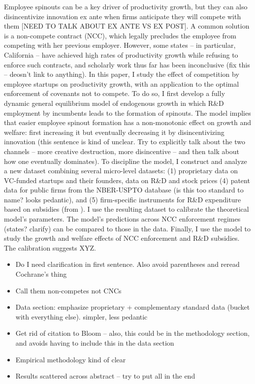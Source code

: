 \documentclass[12pt,english]{article}
\theoremstyle{remark}
\begin{document}
	
		Employee spinouts can be a key driver of productivity growth, but they can also disincentivize innovation ex ante when firms anticipate they will compete with them [NEED TO TALK ABOUT EX ANTE VS EX POST]. A common solution is a non-compete contract (NCC), which legally precludes the employee from competing with her previous employer. However, some states -- in particular, California -- have achieved high rates of productivity growth while refusing to enforce such contracts, and scholarly work thus far has been inconclusive (fix this -- deosn't link to anything). In this paper, I study the effect of competition by employee startups on productivity growth, with an application to the optimal enforcement of covenants not to compete. To do so, I first develop a fully dynamic general equilibrium model of endogenous growth in which R\&D employment by incumbents leads to the formation of spinouts. The model implies that easier employee spinout formation has a non-monotonic effect on growth and welfare: first increasing it but eventually decreasing it by disincentivizing innovation (this sentence is kind of unclear. Try to explicitly talk about the two channels -- more creative destruction, more disincentive -- and then talk about how one eventually dominates). To discipline the model, I construct and analyze a new dataset combining several micro-level datasets: (1) proprietary data on VC-funded startups and their founders, data on R\&D and stock prices (4) patent data for public firms from the NBER-USPTO database (is this too standard to name? looks pedantic), and (5) firm-specific instruments for R\&D expenditure based on subsidies (from \cite{bloom_identifying_2013}). I use the resulting dataset to calibrate the theoretical model's parameters. The model's predictions across NCC enforcement regimes (states? clarify) can be compared to those in the data. Finally, I use the model to study the growth and welfare effects of NCC enforcement and R\&D subsidies. The calibration suggests XYZ.
		
		
		
		\begin{itemize}
			\item Do I need clarification in first sentence. Also avoid parentheses and reread Cochrane's thing
			\item Call them non-competes not CNCs 
			\item Data section: emphasize proprietary + complementary standard data (bucket with everything else). simpler, less pedantic
			\item Get rid of citation to Bloom -- also, this could be in the methodology section, and avoids having to include this in the data section 
			\item Empirical methodology kind of clear
			\item Results scattered across abstract -- try to put all in the end 
		\end{itemize}
		
\end{document}
